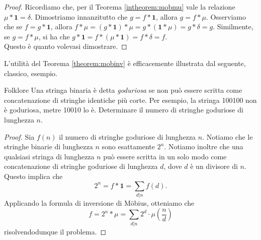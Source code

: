 \documentclass{article}
\begin{document}
\begin{proof}
	Ricordiamo che, per il Teorema \ref{intheorem:mobmu} vale la relazione
	$\mu\ast\textbf{1}=\delta$.
	Dimostriamo innanzitutto che $g=f\ast\textbf{1}$, allora $g=f\ast \mu$.
	Osserviamo che se $f=g\ast\textbf{1}$, allora
	$f\ast\mu=(g\ast\textbf{1})\ast\mu=g\ast(\textbf{1}\ast\mu)=g\ast\delta=g$.
	Similmente, se $g=f\ast\mu$, si ha che
	$g\ast\textbf{1}=f\ast(\mu\ast\textbf{1})=f\ast\delta=f$.\\ Questo è quanto
	volevasi dimostrare.
\end{proof}

L'utilità del Teorema \ref{theorem:mobinv} è efficacemente illustrata dal
seguente, classico, esempio.

\begin{example}{Folklore}{}
	Una stringa binaria è detta \emph{goduriosa} se non può essere
	scritta come concatenazione di stringhe identiche più corte. Per esempio,
	la stringa 100100 non è goduriosa, metre 10010 lo è. Determinare il numero
	di stringhe goduriose di lunghezza $n$.
\end{example}
\begin{proof}
	Sia $f(n)$ il numero di stringhe goduriose di lunghezza $n$.
	Notiamo che le stringhe binarie di lunghezza $n$ sono esattamente $2^n$.
	Notiamo inoltre che una qualsiasi stringa di lunghezza $n$ può essere scritta
	in un solo modo come concatenazione di stringhe goduriose
	di lunghezza $d$, dove $d$ è un divisore di $n$. Questo implica che
	\begin{equation*}
		2^n=f\ast\textbf{1}=\sum_{d\vert n}f(d).
	\end{equation*}
	Applicando la formula di inversione di Möbius, otteniamo che
	\begin{equation*}
		f=2^n\ast\mu=\sum_{d\vert n}2^d\cdot\mu\left(\frac{n}{d}\right)
	\end{equation*}
	risolvendodunque il problema.
\end{proof}
\end{document}
